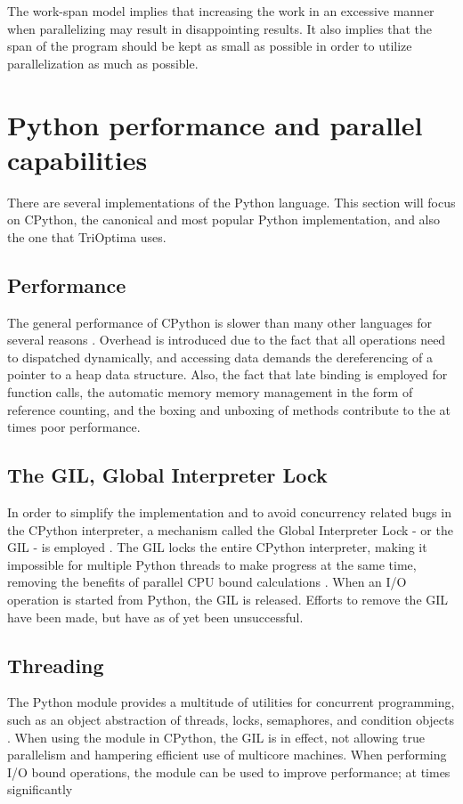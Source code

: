 The work-span model implies that increasing the work in an excessive manner when parallelizing may result in disappointing
results. It also implies that the span of the program should be kept as small as possible in order to utilize parallelization as
much as possible.

\section{Python performance and parallel capabilities}
There are several implementations of the Python language. This section will focus on CPython, the canonical and most popular
Python implementation, and also the one that TriOptima uses.

\subsection{Performance}
The general performance of CPython is slower than many other languages for several
reasons \cite{barany_2014_python_pipd}. Overhead is introduced due to the fact that all operations need to dispatched dynamically,
and accessing data demands the dereferencing of a pointer to a heap data structure. Also, the fact that late binding is employed
for function calls, the automatic memory memory management in the form of reference counting, and the boxing and unboxing of
methods contribute to the at times poor performance.

\subsection{The GIL, Global Interpreter Lock}
In order to simplify the implementation and to avoid concurrency related bugs in the CPython interpreter,
a mechanism called the Global Interpreter Lock - or the GIL - is employed  \cite{palach_2014_parallel_ppwp}.
The GIL locks the entire CPython interpreter, making it impossible for multiple Python threads to make progress at
the same time, removing the benefits of parallel CPU bound calculations
\cite{glossary_gp2d}. When an I/O operation is started from Python, the GIL is released.
Efforts to remove the GIL have been made, but have as of yet been unsuccessful.

\subsection{Threading}
The Python  module provides a multitude of utilities for concurrent programming, such as an object abstraction of
threads, locks, semaphores, and condition objects \cite{16_1thtip2d}. When using the  module in CPython, the GIL is in
effect, not allowing true parallelism and hampering efficient use of multicore machines. When performing I/O bound operations, the
 module can be used to improve performance; at times significantly \cite[p. 121-124]{slatkin_2015_effective_ep5swtwbp}

